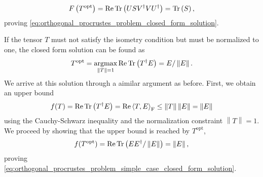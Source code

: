 \begin{equation}
	F\left(T^\text{opt}\right) = \operatorname{Re}\operatorname{Tr}\left(USV^\dagger VU^\dagger\right) = \operatorname{Tr}\left(S\right),
\end{equation}
proving \eqref{eq:orthogonal_procrustes_problem_closed_form_solution}. \par
If the tensor $T$ must not satisfy the isometry condition but must be normalized to one, the closed form solution can be found as
\begin{equation}
	\label{eq:orthogonal_procrustes_problem_simple_case_closed_form_solution}
	T^\text{opt} = \underset{\left\lVert T\right\rVert = 1}{\operatorname{argmax}} \operatorname{Re}\operatorname{Tr}\left(T^\dagger E\right) = E/\left\lVert E\right\rVert.
\end{equation}
We arrive at this solution through a aimilar argument as before. First, we obtain an upper bound
\begin{equation}
	f(T) = \operatorname{Re}\operatorname{Tr}\left(T^\dagger E\right) = \operatorname{Re}\left\langle T, E\right\rangle_\text{F} \le \left\lVert T\right\rVert\left\lVert E\right\rVert = \left\lVert E\right\rVert
\end{equation}
using the Cauchy-Schwarz inequality and the normalization constraint $\left\lVert T\right\rVert = 1$. We proceed by showing that the upper bound is reached by $T^\text{opt}$,
\begin{equation}
	f(T^\text{opt}) = \operatorname{Re}\operatorname{Tr}\left(EE^\dagger/\left\lVert E\right\rVert\right) = \left\lVert E \right\rVert,
\end{equation}
proving \eqref{eq:orthogonal_procrustes_problem_simple_case_closed_form_solution}.